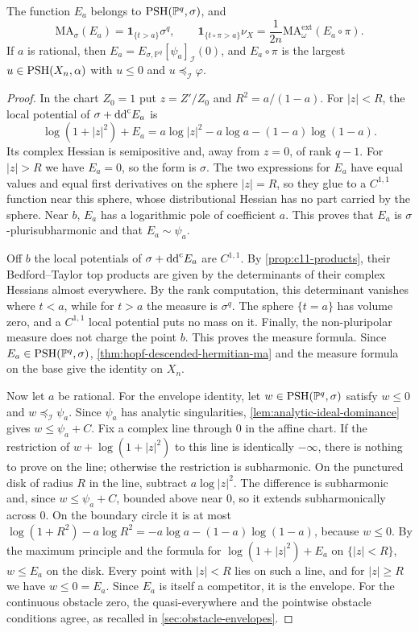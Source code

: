 \begin{proposition}\label{prop:hopf-point-envelope}
The function $E_a$ belongs to $\mathrm{PSH}(\mathbb P^q,\sigma)$, and
\[
 \mathrm{MA}_\sigma(E_a)=\mathbf1_{\{t>a\}}\sigma^q,
 \qquad
 \mathbf1_{\{t\circ\pi>a\}}\nu_X
       =\frac1{2n}\mathrm{MA}^{\mathrm{ext}}_\omega(E_a\circ\pi).
\]
If $a$ is rational, then $E_a=E_{\sigma,\mathbb P^q}[\psi_a]_{\mathcal I}(0)$, and $E_a\circ\pi$ is the largest $u\in\mathrm{PSH}(X_n,\alpha)$ with $u\leq0$ and $u\preceq_{\mathcal I}\varphi$.
\end{proposition}
\begin{proof}
In the chart $Z_0=1$ put $z=Z'/Z_0$ and $R^2=a/(1-a)$. For $|z|<R$, the local potential of $\sigma+\mathrm{dd}^{\mathrm{c}} E_a$ is
\[
 \log(1+|z|^2)+E_a
       =a\log|z|^2-a\log a-(1-a)\log(1-a).
\]
Its complex Hessian is semipositive and, away from $z=0$, of rank $q-1$. For $|z|>R$ we have $E_a=0$, so the form is $\sigma$. The two expressions for $E_a$ have equal values and equal first derivatives on the sphere $|z|=R$, so they glue to a $C^{1,1}$ function near this sphere, whose distributional Hessian has no part carried by the sphere. Near $b$, $E_a$ has a logarithmic pole of coefficient $a$. This proves that $E_a$ is $\sigma$-plurisubharmonic and that $E_a\sim\psi_a$.

Off $b$ the local potentials of $\sigma+\mathrm{dd}^{\mathrm{c}} E_a$ are $C^{1,1}$. By \cref{prop:c11-products}, their Bedford--Taylor top products are given by the determinants of their complex Hessians almost everywhere. By the rank computation, this determinant vanishes where $t<a$, while for $t>a$ the measure is $\sigma^q$. The sphere $\{t=a\}$ has volume zero, and a $C^{1,1}$ local potential puts no mass on it. Finally, the non-pluripolar measure does not charge the point $b$. This proves the measure formula. Since $E_a\in\mathrm{PSH}(\mathbb P^q,\sigma)$, \cref{thm:hopf-descended-hermitian-ma} and the measure formula on the base give the identity on $X_n$.

Now let $a$ be rational. For the envelope identity, let $w\in\mathrm{PSH}(\mathbb P^q,\sigma)$ satisfy $w\leq0$ and $w\preceq_{\mathcal I}\psi_a$. Since $\psi_a$ has analytic singularities, \cref{lem:analytic-ideal-dominance} gives $w\leq\psi_a+C$. Fix a complex line through $0$ in the affine chart. If the restriction of $w+\log(1+|z|^2)$ to this line is identically $-\infty$, there is nothing to prove on the line; otherwise the restriction is subharmonic. On the punctured disk of radius $R$ in the line, subtract $a\log|z|^2$. The difference is subharmonic and, since $w\leq\psi_a+C$, bounded above near $0$, so it extends subharmonically across $0$. On the boundary circle it is at most $\log(1+R^2)-a\log R^2=-a\log a-(1-a)\log(1-a)$, because $w\leq0$. By the maximum principle and the formula for $\log(1+|z|^2)+E_a$ on $\{|z|<R\}$, $w\leq E_a$ on the disk. Every point with $|z|<R$ lies on such a line, and for $|z|\geq R$ we have $w\leq0=E_a$. Since $E_a$ is itself a competitor, it is the envelope. For the continuous obstacle zero, the quasi-everywhere and the pointwise obstacle conditions agree, as recalled in \cref{sec:obstacle-envelopes}.


\end{proof}
